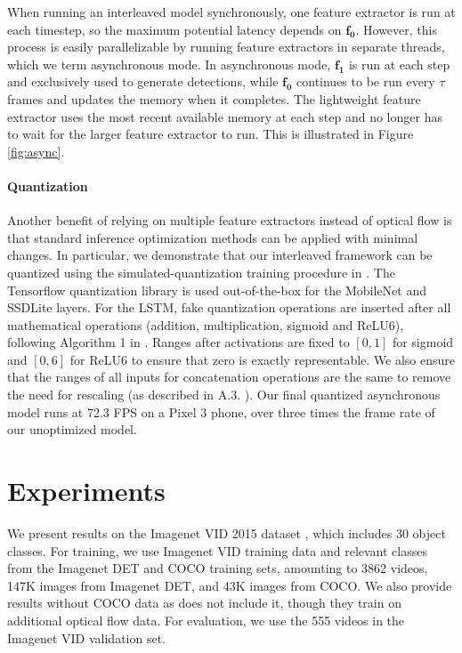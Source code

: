 \documentclass[10pt,twocolumn,letterpaper]{article}
\begin{document}
When running an interleaved model synchronously, one feature extractor is run at each timestep, so the maximum potential latency depends on $\mathbf{f_0}$. However, this process is easily parallelizable by running feature extractors in separate threads, which we term asynchronous mode. In asynchronous mode, $\mathbf{f_1}$ is run at each step and exclusively used to generate detections, while $\mathbf{f_0}$ continues to be run every $\tau$ frames and updates the memory when it completes. The lightweight feature extractor uses the most recent available memory at each step and no longer has to wait for the larger feature extractor to run. This is illustrated in Figure \ref{fig:async}.

\paragraph{\textbf{Quantization}} Another benefit of relying on multiple feature extractors instead of optical flow is that standard inference optimization methods can be applied with minimal changes. In particular, we demonstrate that our interleaved framework can be quantized using the simulated-quantization training procedure in \cite{jacob2018quantization}. The Tensorflow \cite{Abadi} quantization library is used out-of-the-box for the MobileNet and SSDLite layers. For the LSTM, fake quantization operations are inserted after all mathematical operations (addition, multiplication, sigmoid and ReLU6), following Algorithm 1 in \cite{jacob2018quantization}. Ranges after activations are fixed to $[0, 1]$ for sigmoid and $[0, 6]$ for ReLU6 to ensure that zero is exactly representable. We also ensure that the ranges of all inputs for concatenation operations are the same to remove the need for rescaling (as described in A.3. \cite{jacob2018quantization}). Our final quantized asynchronous model runs at 72.3 FPS on a Pixel 3 phone, over three times the frame rate of our unoptimized model.

\section{Experiments}
We present results on the Imagenet VID 2015 dataset \cite{Russakovsky}, which includes 30 object classes. For training, we use Imagenet VID training data and relevant classes from the Imagenet DET \cite{Russakovsky} and COCO \cite{lin2014microsoft} training sets, amounting to 3862 videos, 147K images from Imagenet DET, and 43K images from COCO. We also provide results without COCO data as \cite{zhu2018towardsmobile} does not include it, though they train on additional optical flow data. For evaluation, we use the 555 videos in the Imagenet VID validation set.
\end{document}
